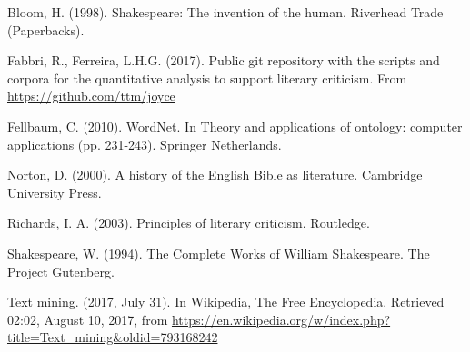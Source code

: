 \documentclass[12pt,fleqn]{article}
\begin{document}
\begin{thebibliography}{99}
\fontsize{11}{0}\selectfont
{}
Bloom, H. (1998). Shakespeare: The invention of the human. Riverhead Trade (Paperbacks).

Fabbri, R., Ferreira, L.H.G. (2017). Public git repository with the scripts and corpora for the quantitative analysis to support literary criticism. From \url{https://github.com/ttm/joyce}

Fellbaum, C. (2010). WordNet. In Theory and applications of ontology: computer applications (pp. 231-243). Springer Netherlands.
 
Norton, D. (2000). A history of the English Bible as literature. Cambridge University Press.

Richards, I. A. (2003). Principles of literary criticism. Routledge.

Shakespeare, W. (1994). The Complete Works of William Shakespeare. The Project Gutenberg.

    Text mining. (2017, July 31). In Wikipedia, The Free Encyclopedia. Retrieved 02:02, August 10, 2017, from \url{https://en.wikipedia.org/w/index.php?title=Text_mining&oldid=793168242}
\end{thebibliography}





\end{document}
